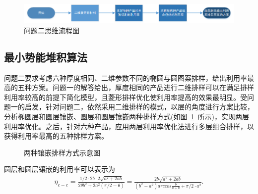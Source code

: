 \documentclass{whutmod}
\begin{document}
				\begin{figure}[H]
				\centering
				\includegraphics[width=\textwidth]{figures/2liu.png}
				\caption{问题二思维流程图}\label{afsd}
			\end{figure}

		\subsection{最小势能堆积算法}
		
		问题二要求考虑六种厚度相同、二维参数不同的椭圆与圆图案排样，给出利用率最高的五种方案。问题一的解答给出，厚度相同的产品进行二维排样可以在满足排样利用率较高的前提下简化模型，且菱形排样优化使利用率提高的效果最明显。受问题一的启发，针对问题二，依然采用二维排样的模式，以层的角度进行方案比较，分析椭圆层和圆层镶嵌、圆层和圆层镶嵌两种排样方式(如图~\ref{afsd}~所示)，实现两层利用率优化。之后，针对六种产品，应用两层利用率优化法进行多层组合排样，以获得利用率最高的五种排样方案。

		\begin{figure}[H]
			\centering
			\caption{两种镶嵌排样方式示意图}\label{gggggg}
		\end{figure}

		圆层和圆层镶嵌的利用率可以表示为
		\begin{gather}
		\eta_{c-c}=\frac{1/2\cdot 2b\cdot 2\sqrt{a^2+2ab}}{2\theta b^2+2a^2(\pi/2-\theta)}=\frac{2b\sqrt{a^2+2ab}}{(b^2-a^2)arccos\frac{b}{a+b}+\pi/2\cdot a^2}.
		\end{gather}
\end{document}
